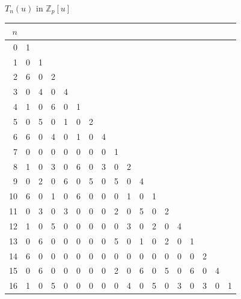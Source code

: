 \documentclass{beamer}
\def\arraystretch{1.5}
\begin{document}
\begin{frame}{$T_n(u)$ in $\mathbb{Z}_p[u]$}
 \vspace{-6pt}
 \renewcommand{\arraystretch}{1.2}
 \tiny
 \begin{table}[]
  \begin{tabular}{|r|l|l|l|l|l|l|l|l|l|l|l|l|l|l|l|l|l|}
   \hline
   $n$ &   &   &   &   &   &   &   &   &   &   &   &   &   &   &   &   &   \\ \hline
   0   & 1 &   &   &   &   &   &   &   &   &   &   &   &   &   &   &   &   \\ \hline
   1   & 0 & 1 &   &   &   &   &   &   &   &   &   &   &   &   &   &   &   \\ \hline
   2   & 6 & 0 & 2 &   &   &   &   &   &   &   &   &   &   &   &   &   &   \\ \hline
   3   & 0 & 4 & 0 & 4 &   &   &   &   &   &   &   &   &   &   &   &   &   \\ \hline
   4   & 1 & 0 & 6 & 0 & 1 &   &   &   &   &   &   &   &   &   &   &   &   \\ \hline
   5   & 0 & 5 & 0 & 1 & 0 & 2 &   &   &   &   &   &   &   &   &   &   &   \\ \hline
   6   & 6 & 0 & 4 & 0 & 1 & 0 & 4 &   &   &   &   &   &   &   &   &   &   \\ \hline
   7   & 0 & 0 & 0 & 0 & 0 & 0 & 0 & 1 &   &   &   &   &   &   &   &   &   \\ \hline
   8   & 1 & 0 & 3 & 0 & 6 & 0 & 3 & 0 & 2 &   &   &   &   &   &   &   &   \\ \hline
   9   & 0 & 2 & 0 & 6 & 0 & 5 & 0 & 5 & 0 & 4 &   &   &   &   &   &   &   \\ \hline
   10  & 6 & 0 & 1 & 0 & 6 & 0 & 0 & 0 & 1 & 0 & 1 &   &   &   &   &   &   \\ \hline
   11  & 0 & 3 & 0 & 3 & 0 & 0 & 0 & 2 & 0 & 5 & 0 & 2 &   &   &   &   &   \\ \hline
   12  & 1 & 0 & 5 & 0 & 0 & 0 & 0 & 0 & 3 & 0 & 2 & 0 & 4 &   &   &   &   \\ \hline
   13  & 0 & 6 & 0 & 0 & 0 & 0 & 0 & 5 & 0 & 1 & 0 & 2 & 0 & 1 &   &   &   \\ \hline
   14  & 6 & 0 & 0 & 0 & 0 & 0 & 0 & 0 & 0 & 0 & 0 & 0 & 0 & 0 & 2 &   &   \\ \hline
   15  & 0 & 6 & 0 & 0 & 0 & 0 & 0 & 2 & 0 & 6 & 0 & 5 & 0 & 6 & 0 & 4 &   \\ \hline
   16  & 1 & 0 & 5 & 0 & 0 & 0 & 0 & 0 & 4 & 0 & 5 & 0 & 3 & 0 & 3 & 0 & 1 \\ \hline
  \end{tabular}
 \end{table}
\end{frame}
\end{document}
